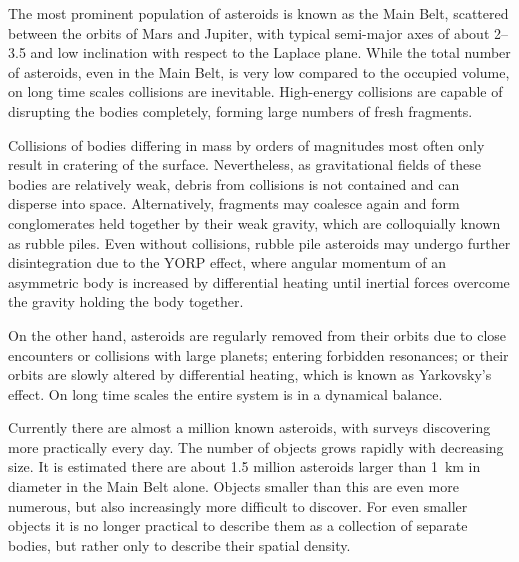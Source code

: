         The most prominent population of asteroids is known as the Main Belt, scattered between the orbits
        of Mars and Jupiter, with typical semi-major axes of about \SIrange{2}{3.5}{\au} and low inclination
        with respect to the Laplace plane. While the total number of asteroids, even in the Main Belt,
        is very low compared to the occupied volume, on long time scales collisions are inevitable.
        High-energy collisions are capable of disrupting the bodies completely, forming large numbers of fresh fragments.

        Collisions of bodies differing in mass by orders of magnitudes most often
        only result in cratering of the surface. Nevertheless, as gravitational fields of these bodies
        are relatively weak, debris from collisions is not contained and can disperse into space.
        Alternatively, fragments may coalesce again and form conglomerates held together by their weak gravity,
        which are colloquially known as rubble piles.
        Even without collisions, rubble pile asteroids may undergo further disintegration due to the YORP effect,
        where angular momentum of an asymmetric body is increased by differential heating
        until inertial forces overcome the gravity holding the body together.

        On the other hand, asteroids are regularly removed from their orbits due to
        close encounters or collisions with large planets; entering forbidden resonances;
        or their orbits are slowly altered by differential heating, which is known as Yarkovsky's effect.
        On long time scales the entire system is in a dynamical balance.

        Currently there are almost a million known asteroids, with surveys discovering more practically every day.
        The number of objects grows rapidly with decreasing size. It is estimated there are about \num{1.5} million
        asteroids larger than \SI{1}{\kilo\metre} in diameter in the Main Belt alone.
        Objects smaller than this are even more numerous, but also increasingly more difficult to discover.
        For even smaller objects it is no longer practical to describe them as a collection of separate bodies,
        but rather only to describe their spatial density.




